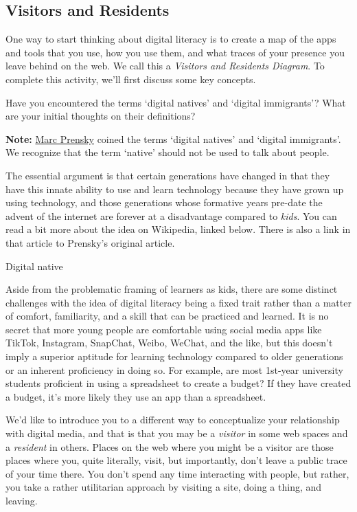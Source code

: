 \documentclass[
]{book}
\theoremstyle{definition}
\theoremstyle{definition}
\theoremstyle{definition}
\theoremstyle{definition}
\theoremstyle{remark}
\begin{document}
\hypertarget{visitors-and-residents}{%
\subsection*{Visitors and Residents}\label{visitors-and-residents}}

One way to start thinking about digital literacy is to create a map of the apps and tools that you use, how you use them, and what traces of your presence you leave behind on the web. We call this a \emph{Visitors and Residents Diagram}. To complete this activity, we'll first discuss some key concepts.

Have you encountered the terms `digital natives' and `digital immigrants'? What are your initial thoughts on their definitions?

\begin{caution}
\textbf{Note:} \href{https://marcprensky.com/}{Marc Prensky} coined the terms `digital natives' and `digital immigrants'. We recognize that the term `native' should not be used to talk about people.
\end{caution}

The essential argument is that certain generations have changed in that they have this innate ability to use and learn technology because they have grown up using technology, and those generations whose formative years pre-date the advent of the internet are forever at a disadvantage compared to \emph{kids}. You can read a bit more about the idea on Wikipedia, linked below. There is also a link in that article to Prensky's original article.

Digital native

Aside from the problematic framing of learners as kids, there are some distinct challenges with the idea of digital literacy being a fixed trait rather than a matter of comfort, familiarity, and a skill that can be practiced and learned. It is no secret that more young people are comfortable using social media apps like TikTok, Instagram, SnapChat, Weibo, WeChat, and the like, but this doesn't imply a superior aptitude for learning technology compared to older generations or an inherent proficiency in doing so. For example, are most 1st-year university students proficient in using a spreadsheet to create a budget? If they have created a budget, it's more likely they use an app than a spreadsheet.

We'd like to introduce you to a different way to conceptualize your relationship with digital media, and that is that you may be a \emph{visitor} in some web spaces and a \emph{resident} in others. Places on the web where you might be a visitor are those places where you, quite literally, visit, but importantly, don't leave a public trace of your time there. You don't spend any time interacting with people, but rather, you take a rather utilitarian approach by visiting a site, doing a thing, and leaving.
\end{document}
